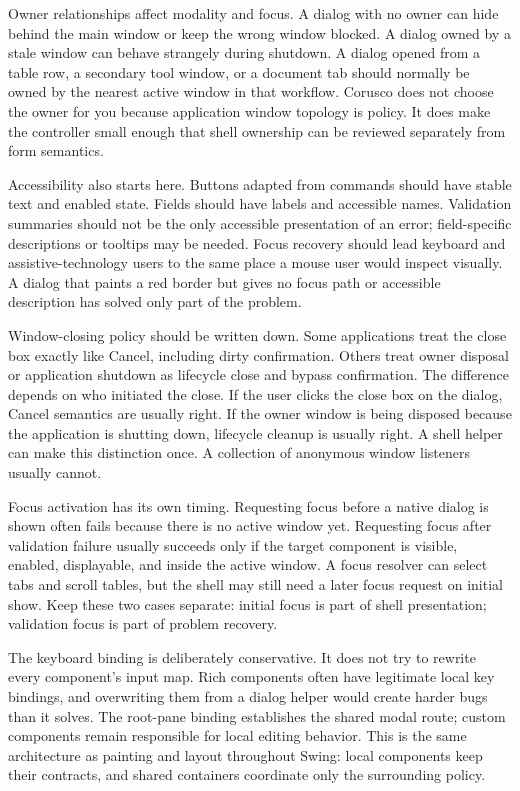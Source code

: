 Owner relationships affect modality and focus. A dialog with no owner can hide
behind the main window or keep the wrong window blocked. A dialog owned by a
stale window can behave strangely during shutdown. A dialog opened from a table
row, a secondary tool window, or a document tab should normally be owned by the
nearest active window in that workflow. Corusco does not choose the owner for
you because application window topology is policy. It does make the controller
small enough that shell ownership can be reviewed separately from form
semantics.

Accessibility also starts here. Buttons adapted from commands should have
stable text and enabled state. Fields should have labels and accessible names.
Validation summaries should not be the only accessible presentation of an
error; field-specific descriptions or tooltips may be needed. Focus recovery
should lead keyboard and assistive-technology users to the same place a mouse
user would inspect visually. A dialog that paints a red border but gives no
focus path or accessible description has solved only part of the problem.

Window-closing policy should be written down. Some applications treat the close
box exactly like Cancel, including dirty confirmation. Others treat owner
disposal or application shutdown as lifecycle close and bypass confirmation.
The difference depends on who initiated the close. If the user clicks the close
box on the dialog, Cancel semantics are usually right. If the owner window is
being disposed because the application is shutting down, lifecycle cleanup is
usually right. A shell helper can make this distinction once. A collection of
anonymous window listeners usually cannot.

Focus activation has its own timing. Requesting focus before a native dialog is
shown often fails because there is no active window yet. Requesting focus after
validation failure usually succeeds only if the target component is visible,
enabled, displayable, and inside the active window. A focus resolver can select
tabs and scroll tables, but the shell may still need a later focus request on
initial show. Keep these two cases separate: initial focus is part of shell
presentation; validation focus is part of problem recovery.

The keyboard binding is deliberately conservative. It does not try to rewrite
every component's input map. Rich components often have legitimate local key
bindings, and overwriting them from a dialog helper would create harder bugs
than it solves. The root-pane binding establishes the shared modal route; custom
components remain responsible for local editing behavior. This is the same
architecture as painting and layout throughout Swing: local components keep
their contracts, and shared containers coordinate only the surrounding policy.


